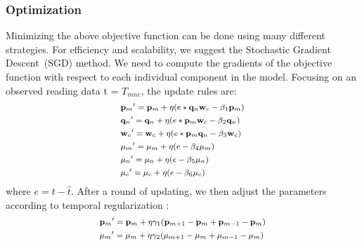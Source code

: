 
\subsubsection{Optimization}
Minimizing the above objective function can be done using many different strategies.
For efficiency and scalability, we suggest the Stochastic Gradient Descent~(SGD) method.
We need to compute the gradients of the objective function with respect to each individual component in the model.
Focusing on an observed reading data t = $T_{mnc} $, the update rules are:
\begin{equation*}
\small
\begin{aligned}
&{\mathbf{p}_m}^\prime={\mathbf{p}_m}+\eta(e*\mathbf{q}_n \mathbf{w}_c - \beta_1 \mathbf{p}_m)
\\&{\mathbf{q}_n}^\prime={\mathbf{q}_n}+\eta(e*\mathbf{p}_m \mathbf{w}_c - \beta_2 \mathbf{q}_n)
\\&{\mathbf{w}_c}^\prime={\mathbf{w}_c}+\eta(e*\mathbf{p}_m \mathbf{q}_n - \beta_3 \mathbf{w}_c)
\\&{\mu_m}^\prime=\mu_m+\eta(e-\beta_4\mu_m)
\\&{\mu_n}^\prime=\mu_n+\eta(e-\beta_5\mu_n)
\\&{\mu_c}^\prime=\mu_c+\eta(e-\beta_6\mu_c)
\end{aligned}
\end{equation*}
where $e=t-\hat{t}$. After a round of updating, we then adjust the parameters according to temporal regularization :
\begin{equation*}
\small
\begin{aligned}
&{\mathbf{p}_m}^\prime={\mathbf{p}_m}+\eta\gamma_1(\mathbf{p}_{m+1}-\mathbf{p}_m+\mathbf{p}_{m-1}-\mathbf{p}_m)
\\&{\mu_m}^\prime=\mu_m+\eta\gamma_2(\mu_{m+1}-\mu_m+\mu_{m-1}-\mu_m)
\end{aligned}
\end{equation*}

